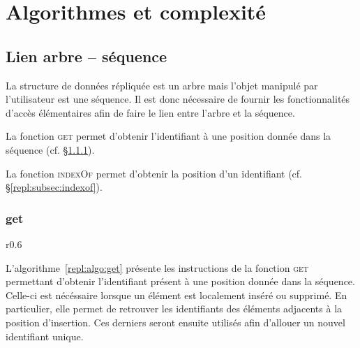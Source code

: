 
\section{Algorithmes et complexité}


\subsection{Lien arbre -- séquence}

La structure de données répliquée est un arbre mais l'objet manipulé par
l'utilisateur est une séquence. Il est donc nécessaire de fournir les
fonctionnalités d'accès élémentaires afin de faire le lien entre l'arbre et la
séquence.
\begin{inparaenum}[(i)]
\item La fonction \textsc{get} permet d'obtenir l'identifiant à une position
  donnée dans la séquence (cf. §\ref{repl:subsec:get}).
\item La fonction \textsc{indexOf} permet d'obtenir la position d'un
  identifiant (cf. §\ref{repl:subsec:indexof}).
\end{inparaenum}

\subsubsection{get}
\label{repl:subsec:get}

\begin{wrapfigure}{r}{0.6\textwidth}
  \vspace{-35pt} %
  \begin{minipage}[t]{0.6\textwidth}
    \begin{algorithm}[H]
      
      \caption{\label{repl:algo:get} Get.}
    \end{algorithm}
  \end{minipage}
  \vspace{-15pt}
\end{wrapfigure}

L'algorithme~\ref{repl:algo:get} présente les instructions de la fonction
\textsc{get} permettant d'obtenir l'identifiant présent à une position donnée
dans la séquence. Celle-ci est nécéssaire lorsque un élément est localement
inséré ou supprimé. En particulier, elle permet de retrouver les identifiants
des éléments adjacents à la position d'insertion. Ces derniers seront ensuite
utilisés afin d'allouer un nouvel identifiant unique.

